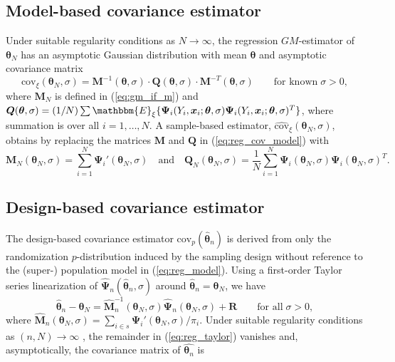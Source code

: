 \documentclass[a4paper,oneside,11pt,DIV=12]{scrartcl}
\theoremstyle{remark}
\begin{document}
\subsection{Model-based covariance estimator}
Under suitable regularity conditions as $N \rightarrow \infty$, the regression $GM$-estimator of $\bm \theta_N$ has an asymptotic Gaussian distribution with mean $\bm \theta$ and asymptotic covariance matrix \citep[][Chap. 6.3]{hampel_ronchetti_etal_1986}
\begin{equation}\label{eq:reg_cov_model}
    \mathrm{cov}_{\xi}(\bm \theta_N, \sigma) = \bm M^{-1}(\bm \theta, \sigma) \cdot \bm Q(\bm \theta, \sigma) \cdot \bm M^{-T}(\bm \theta, \sigma) \qquad \text{for known} \; \sigma > 0,
\end{equation}
where $\bm M_N$ is defined in (\ref{eq:gm_if_m}) and $\bm Q(\bm \theta, \sigma) = (1/N) \sum \mathbbm{E}_{\xi} \{ \bm \Psi_i(Y_i, \bm x_i;\bm \theta, \sigma) \bm \Psi_i(Y_i, \bm x_i;\bm \theta, \sigma)^T \}$, where summation is over all $i=1,\ldots,N$. A sample-based estimator, $\widehat{\mathrm{cov}}_{\xi}(\bm \theta_N, \sigma)$, obtains by replacing the matrices $\bm M$ and $\bm Q$ in (\ref{eq:reg_cov_model}) with
\begin{equation*}
    \bm M_N(\bm \theta_N, \sigma) = \sum_{i=1}^N \bm \Psi_i'(\bm \theta_N, \sigma) \quad \text{and} \quad
    \bm Q_N(\bm \theta_N, \sigma) = \frac{1}{N} \sum_{i = 1}^N  \bm \Psi_i(\bm \theta_N, \sigma) \bm \Psi_i(\bm \theta_N, \sigma)^T.
\end{equation*}

\subsection{Design-based covariance estimator}
The design-based covariance estimator $\mathrm{cov}_p(\widehat{\bm \theta}_n)$ is derived from only the randomization $p$-distribution induced by the sampling design without reference to the (super-) population model in (\ref{eq:reg_model}). Using a first-order Taylor series linearization of $\widehat{\bm \Psi}_n(\widehat{\bm \theta}_n, \sigma)$ around $\widehat{\bm \theta}_n = \bm \theta_N$, we have \citep[see e.g.][]{binder_1983}
\begin{equation}\label{eq:reg_taylor}
    \widehat{\bm \theta}_n - \bm \theta_N = \widehat{\bm M}_n^{-1}(\bm \theta_N, \sigma) \widehat{\bm \Psi}_n(\bm \theta_N, \sigma) + \bm R \qquad \text{for all} \; \sigma > 0,
\end{equation}
\noindent where $\widehat{\bm M}_n(\bm \theta_N, \sigma) = \sum_{i \in s} \bm \Psi_i'(\bm \theta_N, \sigma) / \pi_i$. Under suitable regularity conditions as $(n, N) \rightarrow \infty$ \citep[see][]{binder_1983}, the remainder in (\ref{eq:reg_taylor}) vanishes and, asymptotically, the covariance matrix of $\widehat{\bm \theta_n}$ is
\end{document}
